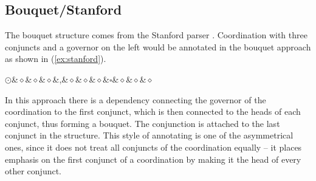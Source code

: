 \subsection{Bouquet/Stanford}
The bouquet structure comes from the Stanford parser \citep{de-marneffe-etal-2006-generating}. Coordination with three conjuncts and a governor on the left would be annotated in the bouquet approach as shown in (\ref{ex:stanford}).

\begin{exe}
\centering
\ex\label{ex:stanford}
\begin{dependency}[theme = simple]
        \begin{deptext}
        $\odot$\&$\diamond$\&$\diamond$\&$\diamond$\&,\&$\diamond$\&$\diamond$\&$\diamond$\&$\square$\&$\diamond$\&$\diamond$\&$\diamond$\\
            \end{deptext}
        \end{dependency}
\end{exe}

In this approach there is a dependency connecting the governor of the coordination to the first conjunct, which is then connected to the heads of each conjunct, thus forming a bouquet. The conjunction is attached to the last conjunct in the structure. This style of annotating is one of the asymmetrical ones, since it does not treat all conjuncts of the coordination equally -- it places emphasis on the first conjunct of a coordination by making it the head of every other conjunct. 

\vspace{-0.5\treeheight}

